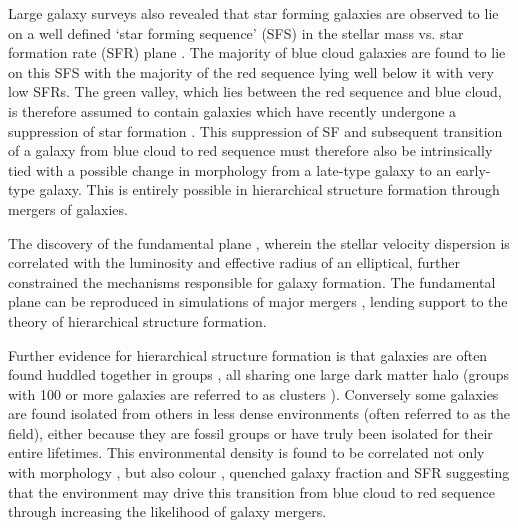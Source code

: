 Large galaxy surveys also revealed that star forming galaxies are observed to lie on a well defined `star forming sequence' (SFS) in the stellar mass vs. star formation rate (SFR) plane \citep{brinchmann04, Salim07, daddi07}. The majority of blue cloud galaxies are found to lie on this SFS with the majority of the red sequence lying well below it with very low SFRs. The green valley, which lies between the red sequence and blue cloud, is therefore assumed to contain galaxies which have recently undergone a suppression of star formation \citep[SF;][]{Salim07}. This suppression of SF and subsequent transition of a galaxy from blue cloud to red sequence must therefore also be intrinsically tied with a possible change in morphology from a {\minor late-type} galaxy to an {\minor early-type} galaxy. This is entirely possible in hierarchical structure formation through mergers of galaxies.

The discovery of the fundamental plane \citep{dressler87, djorgovski87}, wherein the stellar velocity dispersion is correlated with the luminosity and effective radius of an elliptical, further constrained the mechanisms responsible for galaxy formation. The fundamental plane can be reproduced in simulations of major mergers \citep{bekki98, nipoti03, boylan05, robertson06, hilz12, taranu15}, lending support to the theory of hierarchical structure formation.

Further evidence for hierarchical structure formation is that galaxies are often found huddled together in groups \citep{zwicky38, zwicky52, abell58}, all sharing one large dark matter halo (groups with 100 or more galaxies are referred to as clusters \citealt{bower04}). Conversely some galaxies are found isolated from others in less dense environments (often referred to as the field), either because they are fossil groups \citep[where all members have eventually merged][]{ponman94, jones00, jones03} or have truly been isolated for their entire lifetimes. This environmental density is found to be correlated not only with morphology \citep[][and see Figure~\ref{fig:dressler}]{dressler80, smail97, poggianti99, postman05, Bamford09}, but also colour \citep{butcher78, pimbblet02}, quenched galaxy fraction \citep{kauffmann03, Baldry06, peng12, darvish16} and SFR \citep{gomez03} suggesting that the environment may drive this transition from blue cloud to red sequence through increasing the likelihood of galaxy mergers. 

